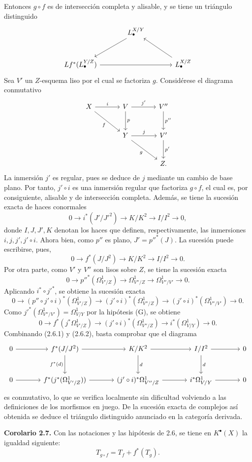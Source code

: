 Entonces $g\circ f$ es de intersección completa y alisable, y se tiene un
triángulo distinguido
\[
\begin{tikzcd}[column sep=large,row sep=large]
& L^{X/Y}_\bullet \arrow[dl] \\
Lf^*(L^{Y/Z}_\bullet) \arrow[rr] && L^{X/Z}_\bullet \arrow[ul]
\end{tikzcd}
\]
Sea $V'$ un $Z$-esquema liso por el cual se factoriza $g$. Considérese el
diagrama conmutativo
\[
\begin{tikzcd}[column sep=large,row sep=large]
X \arrow[r,"i"] \arrow[dr,"f"'] & V \arrow[r,"j'"] \arrow[d,"p"] & V'' \arrow[d,"p''"]\\
& Y \arrow[r,"j"] \arrow[dr,"g"'] & V' \arrow[d,"p'"]\\
& & Z .
\end{tikzcd}
\]
La inmersión $j'$ es regular, pues se deduce de $j$ mediante un cambio de base
plano. Por tanto, $j'\circ i$ es una inmersión regular que factoriza
$g\circ f$, el cual es, por consiguiente, alisable y de intersección completa.
Además, se tiene la sucesión exacta de haces conormales
\[
0\longrightarrow i^*(J'/J'^2)\longrightarrow K/K^2\longrightarrow I/I^2\longrightarrow0,
\]
donde $I,J,J',K$ denotan los haces que definen, respectivamente, las
inmersiones $i,j,j',j'\circ i$. Ahora bien, como $p''$ es plano,
$J'=p''^*(J)$. La sucesión puede escribirse, pues,
\begin{equation}\tag{2.6.1}
0\longrightarrow f^*(J/J^2)\longrightarrow K/K^2\longrightarrow I/I^2\longrightarrow0.
\end{equation}
Por otra parte, como $V'$ y $V''$ son lisos sobre $Z$, se tiene la sucesión
exacta
\[
0\longrightarrow p''^*(\Omega^1_{V'/Z})\longrightarrow\Omega^1_{V''/Z}\longrightarrow\Omega^1_{V''/V'}\longrightarrow0.
\]
Aplicando $i^*\circ j'^*$, se obtiene la sucesión exacta
\[
0\longrightarrow (p''\circ j'\circ i)^*(\Omega^1_{V'/Z})\longrightarrow (j'\circ i)^*(\Omega^1_{V''/Z})\longrightarrow (j'\circ i)^*(\Omega^1_{V''/V'})\longrightarrow0.
\]
Como $j'^*(\Omega^1_{V''/V'})=\Omega^1_{V/Y}$ por la hipótesis (G), se obtiene
\begin{equation}\tag{2.6.2}
0\longrightarrow f^*(j^*\Omega^1_{V'/Z})\longrightarrow (j'\circ i)^*(\Omega^1_{V''/Z})\longrightarrow i^*(\Omega^1_{V/Y})\longrightarrow0.
\end{equation}
Combinando (2.6.1) y (2.6.2), basta comprobar que el diagrama
\[
\begin{tikzcd}[column sep=large,row sep=large]
0 \arrow[r] & f^*(J/J^2) \arrow[r] \arrow[d,"f^*(d)"'] & K/K^2 \arrow[r] \arrow[d,"d"] & I/I^2 \arrow[r] \arrow[d,"d"] & 0\\
0 \arrow[r] & f^*(j^*(\Omega^1_{V'/Z})) \arrow[r] & (j'\circ i)^*\Omega^1_{V''/Z} \arrow[r] & i^*\Omega^1_{V/Y} \arrow[r] & 0
\end{tikzcd}
\]
es conmutativo, lo que se verifica localmente sin dificultad volviendo a las
definiciones de los morfismos en juego. De la sucesión exacta de complejos así
obtenida se deduce el triángulo distinguido anunciado en la categoría derivada.

\textbf{Corolario 2.7.} Con las notaciones y las hipótesis de 2.6, se tiene en
$K^{\bullet}(X)$ la igualdad siguiente:
\[
T_{g\circ f}=T_f+f^*(T_g).
\]
